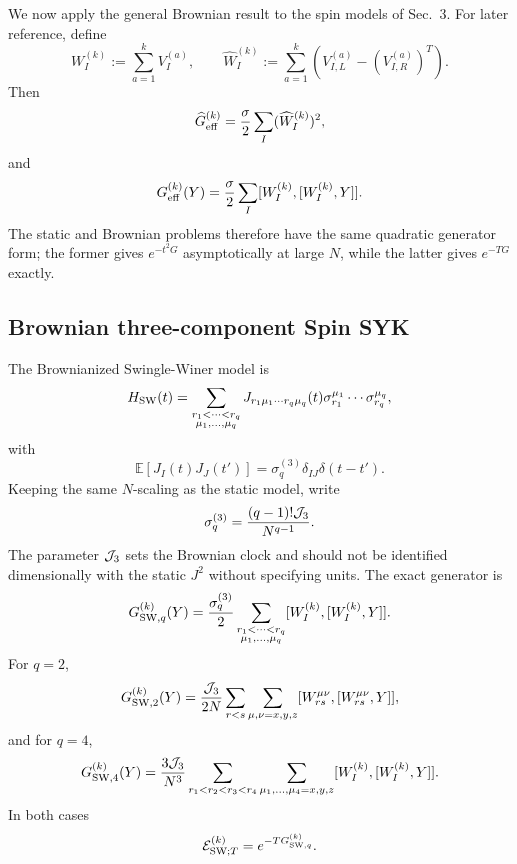 \documentclass{article}
\theoremstyle{definition}
\begin{document}
We now apply the general Brownian result to the spin models of Sec.~3.
For later reference, define
\begin{equation}
    W_I^{(k)}:=\sum_{a=1}^kV_I^{(a)},
    \qquad
    \widehat W_I^{(k)}
    :=\sum_{a=1}^k
      \left(V_{I,L}^{(a)}-(V_{I,R}^{(a)})^T\right).
\end{equation}
Then
\begin{equation}
    \widehat G_{\rm eff}^{(k)}
    =\frac{\sigma}{2}\sum_I(\widehat W_I^{(k)})^2,
\end{equation}
and
\begin{equation}
    G_{\rm eff}^{(k)}(Y)
    =\frac{\sigma}{2}\sum_I
      [W_I^{(k)},[W_I^{(k)},Y]].
\end{equation}
The static and Brownian problems therefore have the same quadratic generator
form; the former gives $e^{-t^2G}$ asymptotically at large $N$, while the
latter gives $e^{-TG}$ exactly.

\subsection{Brownian three-component Spin SYK}

The Brownianized Swingle-Winer model is
\begin{equation}
    H_{\rm SW}(t)
    =\sum_{\substack{r_1<\cdots<r_q\\
                    \mu_1,\ldots,\mu_q}}
    J_{r_1\mu_1\cdots r_q\mu_q}(t)
    \sigma_{r_1}^{\mu_1}\cdots\sigma_{r_q}^{\mu_q},
\end{equation}
with
\begin{equation}
    \mathbb E[J_I(t)J_J(t')]
    =\sigma_q^{(3)}\delta_{IJ}\delta(t-t').
\end{equation}
Keeping the same $N$-scaling as the static model, write
\begin{equation}
    \sigma_q^{(3)}
    =\frac{(q-1)!{\cal J}_3}{N^{q-1}}.
\end{equation}
The parameter ${\cal J}_3$ sets the Brownian clock and should not be
identified dimensionally with the static $J^2$ without specifying units.
The exact generator is
\begin{equation}
    G_{{\rm SW},q}^{(k)}(Y)
    =\frac{\sigma_q^{(3)}}{2}
    \sum_{\substack{r_1<\cdots<r_q\\
                    \mu_1,\ldots,\mu_q}}
    [W_I^{(k)},[W_I^{(k)},Y]].
\end{equation}
For $q=2$,
\begin{equation}
    G_{{\rm SW},2}^{(k)}(Y)
    =\frac{{\cal J}_3}{2N}
    \sum_{r<s}\sum_{\mu,\nu=x,y,z}
    [W_{rs}^{\mu\nu},[W_{rs}^{\mu\nu},Y]],
\end{equation}
and for $q=4$,
\begin{equation}
    G_{{\rm SW},4}^{(k)}(Y)
    =\frac{3{\cal J}_3}{N^3}
    \sum_{r_1<r_2<r_3<r_4}
    \sum_{\mu_1,\ldots,\mu_4=x,y,z}
    [W_I^{(k)},[W_I^{(k)},Y]].
\end{equation}
In both cases
\begin{equation}
    {\cal E}_{{\rm SW};T}^{(k)}
    =e^{-TG_{{\rm SW},q}^{(k)}}.
\end{equation}
\end{document}
